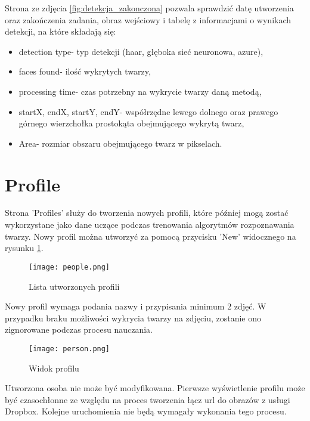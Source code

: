 \pagebreak

Strona ze zdjęcia \ref{fig:detekcja_zakonczona} pozwala sprawdzić datę utworzenia oraz zakończenia zadania, obraz wejściowy i tabelę z informacjami o wynikach detekcji, na które składają się:
\begin{itemize}
\item detection type- typ detekcji (haar, głęboka sieć neuronowa, azure),
\item faces found- ilość wykrytych twarzy,
\item processing time- czas potrzebny na wykrycie twarzy daną metodą,
\item startX, endX, startY, endY- współrzędne lewego dolnego oraz prawego górnego wierzchołka prostokąta obejmującego wykrytą twarz,
\item Area- rozmiar obszaru obejmującego twarz w pikselach.
\end{itemize}

\section{Profile}
Strona 'Profiles' służy do tworzenia nowych profili, które później mogą zostać wykorzystane jako dane uczące podczas trenowania algorytmów rozpoznawania twarzy. Nowy profil można utworzyć za pomocą przycisku 'New' widocznego na rysunku \ref{fig:people}.
\begin{figure}[H]
	\centering
	\texttt{[image: people.png]}
	\caption{Lista utworzonych profili}
	\label{fig:people}
\end{figure}
Nowy profil wymaga podania nazwy i przypisania minimum 2 zdjęć. W przypadku braku możliwości wykrycia twarzy na zdjęciu, zostanie ono zignorowane podczas procesu nauczania.
\begin{figure}[H]
	\centering
	\texttt{[image: person.png]}
	\caption{Widok profilu}
	\label{fig:person}
\end{figure}
Utworzona osoba nie może być modyfikowana. Pierwsze wyświetlenie profilu może być czasochłonne ze względu na proces tworzenia łącz url do obrazów z usługi Dropbox. Kolejne uruchomienia nie będą wymagały wykonania tego procesu.

